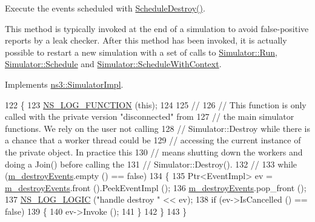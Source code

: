 Execute the events scheduled with \hyperlink{classns3_1_1RealtimeSimulatorImpl_ae22a54510f33ada8fa03f90ba7e38bda}{Schedule\+Destroy()}.

This method is typically invoked at the end of a simulation to avoid false-\/positive reports by a leak checker. After this method has been invoked, it is actually possible to restart a new simulation with a set of calls to \hyperlink{classns3_1_1Simulator_a84be982e6d03b62c3dc3303c75a9b909}{Simulator\+::\+Run}, \hyperlink{classns3_1_1Simulator_a671882c894a08af4a5e91181bf1eec13}{Simulator\+::\+Schedule} and \hyperlink{classns3_1_1Simulator_a86dbaef45a15a42365d7d2ae550449f6}{Simulator\+::\+Schedule\+With\+Context}. 

Implements \hyperlink{classns3_1_1SimulatorImpl_a421e634f3a4035941f00e72f367506fa}{ns3\+::\+Simulator\+Impl}.


\begin{DoxyCode}
122 \{
123   \hyperlink{log-macros-disabled_8h_a90b90d5bad1f39cb1b64923ea94c0761}{NS\_LOG\_FUNCTION} (\textcolor{keyword}{this});
124 
125   \textcolor{comment}{//}
126   \textcolor{comment}{// This function is only called with the private version "disconnected" from}
127   \textcolor{comment}{// the main simulator functions.  We rely on the user not calling }
128   \textcolor{comment}{// Simulator::Destroy while there is a chance that a worker thread could be}
129   \textcolor{comment}{// accessing the current instance of the private object.  In practice this}
130   \textcolor{comment}{// means shutting down the workers and doing a Join() before calling the}
131   \textcolor{comment}{// Simulator::Destroy().}
132   \textcolor{comment}{//}
133   \textcolor{keywordflow}{while} (\hyperlink{classns3_1_1RealtimeSimulatorImpl_a18d17218962a0da6376ac2c05ba9a71a}{m\_destroyEvents}.empty () == \textcolor{keyword}{false}) 
134     \{
135       Ptr<EventImpl> ev = \hyperlink{classns3_1_1RealtimeSimulatorImpl_a18d17218962a0da6376ac2c05ba9a71a}{m\_destroyEvents}.front ().PeekEventImpl ();
136       \hyperlink{classns3_1_1RealtimeSimulatorImpl_a18d17218962a0da6376ac2c05ba9a71a}{m\_destroyEvents}.pop\_front ();
137       \hyperlink{group__logging_ga88acd260151caf2db9c0fc84997f45ce}{NS\_LOG\_LOGIC} (\textcolor{stringliteral}{"handle destroy "} << ev);
138       \textcolor{keywordflow}{if} (ev->IsCancelled () == \textcolor{keyword}{false})
139         \{
140           ev->Invoke ();
141         \}
142     \}
143 \}
\end{DoxyCode}
